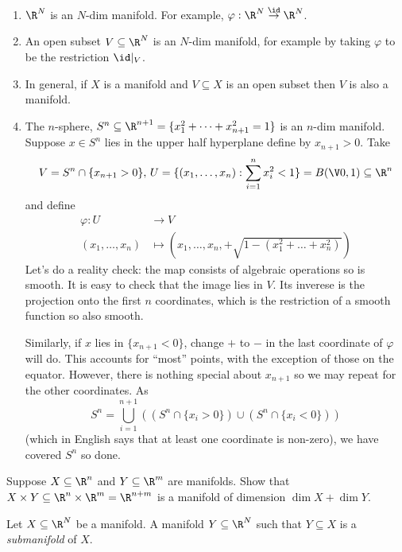 \documentclass[a4paper]{article}
\begin{document}
\begin{eg}\leavevmode
  \begin{enumerate}
  \item \(\R^N\) is an \(N\)-dim manifold. For example, \(\varphi: \R^N \stackrel{\id}{\to} \R^N\).
  \item An open subset \(V \subseteq \R^N\) is an \(N\)-dim manifold, for example by taking \(\varphi\) to be the restriction \(\id|_V\).
  \item In general, if \(X\) is a manifold and \(V \subseteq X\) is an open subset then \(V\) is also a manifold.
  \item The \(n\)-sphere, \(S^n \subseteq \R^{n + 1} = \{x_1^2 + \dots + x_{n + 1}^2 = 1\}\) is an \(n\)-dim manifold. Suppose \(x \in S^n\) lies in the upper half hyperplane define by \(x_{n + 1} > 0\). Take
    \[
      V = S^n \cap \{x_{n + 1} > 0\},\, U = \{(x_1, \dots, x_n): \sum_{i = 1}^n x_i^2 < 1\} = B(\V 0, 1) \subseteq \R^n
    \]
    and define
    \begin{align*}
      \varphi: U &\to V \\
      (x_1, \dots, x_n) &\mapsto \left(x_1, \dots, x_n, +\sqrt{1 - (x_1^2 + \dots + x_n^2)}\right)
    \end{align*}
    Let's do a reality check: the map consists of algebraic operations so is smooth. It is easy to check that the image lies in \(V\). Its inverese is the projection onto the first \(n\) coordinates, which is the restriction of a smooth function so also smooth.

    Similarly, if \(x\) lies in \(\{x_{n + 1} < 0\}\), change \(+\) to \(-\) in the last coordinate of \(\varphi\) will do. This accounts for ``most'' points, with the exception of those on the equator. However, there is nothing special about \(x_{n + 1}\) so we may repeat for the other coordinates. As
    \[
      S^n = \bigcup_{i = 1}^{n + 1} \left( (S^n \cap \{x_i > 0\}) \cup (S^n \cap \{x_i < 0\}) \right)
    \]
    (which in English says that at least one coordinate is non-zero), we have covered \(S^n\) so done.
  \end{enumerate}
\end{eg}

\begin{ex}
  Suppose \(X \subseteq \R^n\) and \(Y \subseteq \R^m\) are manifolds. Show that \(X \times Y \subseteq \R^n \times \R^m = \R^{n + m}\) is a manifold of dimension \(\dim X + \dim Y\).
\end{ex}

\begin{definition}[Submanifold]
  Let \(X \subseteq \R^N\) be a manifold. A manifold \(Y \subseteq \R^N\) such that \(Y \subseteq X\) is a \emph{submanifold} of \(X\).
\end{definition}
\end{document}
